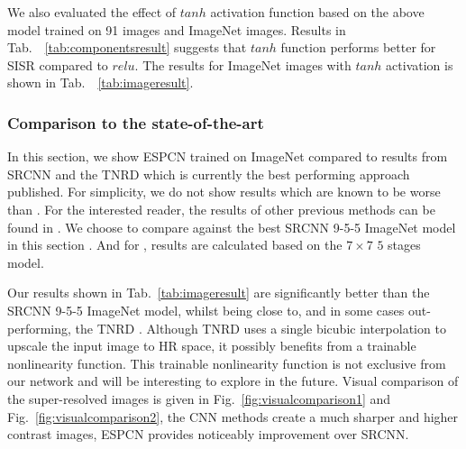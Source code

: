 \documentclass[10pt,twocolumn,letterpaper]{article}
\begin{document}
We also evaluated the effect of $tanh$ activation function based on the above model trained on 91 images and ImageNet images. Results in Tab.~~\ref{tab:componentsresult} suggests that $tanh$ function performs better for \ac{SISR} compared to $relu$. The results for ImageNet images with $tanh$ activation is shown in Tab.~~\ref{tab:imageresult}.

\subsubsection{Comparison to the state-of-the-art}
\label{subsection:accuracy}

In this section, we show \ac{ESPCN} trained on ImageNet compared to results from SRCNN \cite{dong2015image} and the \ac{TNRD} \cite{chen2015trainable} which is currently the best performing approach published. For simplicity, we do not show results which are known to be worse than \cite{chen2015trainable}. For the interested reader, the results of other previous methods can be found in \cite{schulter2015fast}. We choose to compare against the best SRCNN 9-5-5 ImageNet model in this section \cite{dong2015image}. And for \cite{chen2015trainable}, results are calculated based on the $7\times7$ $5$ stages model.

Our results shown in Tab.~\ref{tab:imageresult} are significantly better than the SRCNN 9-5-5 ImageNet model, whilst being close to, and in some cases out-performing, the \ac{TNRD} \cite{chen2015trainable}. Although \ac{TNRD} uses a single bicubic interpolation to upscale the input image to \ac{HR} space, it possibly benefits from a trainable nonlinearity function. This trainable nonlinearity function is not exclusive from our network and will be interesting to explore in the future. Visual comparison of the super-resolved images is given in Fig.~\ref{fig:visualcomparison1} and Fig.~\ref{fig:visualcomparison2}, the \ac{CNN} methods create a much sharper and higher contrast images, \ac{ESPCN} provides noticeably improvement over SRCNN.
\end{document}
